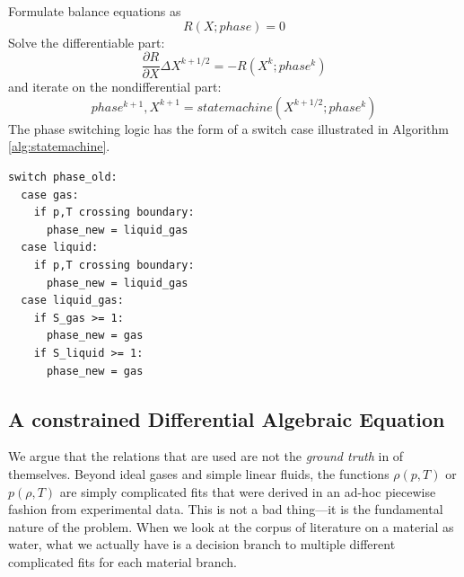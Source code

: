 \documentclass[AMA,STIX1COL]{WileyNJD-v2}
\begin{document}
Formulate balance equations as
\begin{equation}
R(X ; phase) = 0
\end{equation}
Solve the differentiable part:
\[\frac{\partial R}{\partial X}\Delta X^{k+1/2} = -R(X^k ; phase^k)\]
and iterate on the nondifferential part:
\[phase^{k+1},X^{k+1} = statemachine(X^{k+1/2} ; phase^k)\]
The phase switching logic has the form of a switch case illustrated in
Algorithm \ref{alg:statemachine}.

 
\begin{algorithm}
\begin{lstlisting}[caption={Finite State Machine transition logic}, label={alg:statemachine}]
switch phase_old:
  case gas:
    if p,T crossing boundary:
      phase_new = liquid_gas
  case liquid:
    if p,T crossing boundary:
      phase_new = liquid_gas
  case liquid_gas:
    if S_gas >= 1:
      phase_new = gas
    if S_liquid >= 1:
      phase_new = gas
\end{lstlisting}
\end{algorithm}


\hypertarget{header-n3262}{%
\subsection{A constrained Differential Algebraic
Equation}\label{header-n3262}}

We argue that the relations that are used are not the \emph{ground
truth} in of themselves. Beyond ideal gases and simple linear fluids,
the functions \(\rho(p,T)\) or \(p(\rho,T)\) are simply complicated fits
that were derived in an ad-hoc piecewise fashion from experimental data.
This is not a bad thing---it is the fundamental nature of the problem.
When we look at the corpus of literature on a material as water, what we
actually have is a decision branch to multiple different complicated
fits for each material branch.
\end{document}
